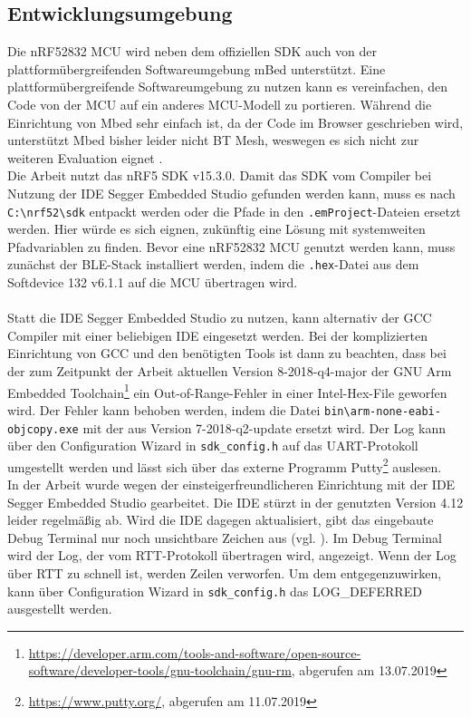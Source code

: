 \subsection{Entwicklungsumgebung}
Die nRF52832 MCU wird neben dem offiziellen SDK auch von der plattformübergreifenden Softwareumgebung mBed unterstützt.
Eine plattformübergreifende Softwareumgebung zu nutzen kann es vereinfachen, den Code von der MCU auf ein anderes MCU-Modell zu portieren.
Während die Einrichtung von Mbed sehr einfach ist, da der Code im Browser geschrieben wird, unterstützt Mbed bisher leider nicht BT Mesh, weswegen es sich nicht zur weiteren Evaluation eignet \cite{site_mbedMesh}.\\
Die Arbeit nutzt das nRF5 SDK v15.3.0.
Damit das SDK vom Compiler bei Nutzung der IDE Segger Embedded Studio gefunden werden kann, muss es nach \texttt{C:\textbackslash{}nrf52\textbackslash{}sdk} entpackt werden oder die Pfade in den \texttt{.emProject}-Dateien ersetzt werden.
Hier würde es sich eignen, zukünftig eine Lösung mit systemweiten Pfadvariablen zu finden.
Bevor eine nRF52832 MCU genutzt werden kann, muss zunächst der BLE-Stack installiert werden, indem die \texttt{.hex}-Datei aus dem Softdevice 132 v6.1.1 auf die MCU übertragen wird.\\\\
Statt die IDE Segger Embedded Studio zu nutzen, kann alternativ der GCC Compiler mit einer beliebigen IDE eingesetzt werden.
Bei der komplizierten Einrichtung von GCC und den benötigten Tools ist dann zu beachten, dass bei der zum Zeitpunkt der Arbeit aktuellen Version 8-2018-q4-major der GNU Arm Embedded Toolchain\footnote{\url{https://developer.arm.com/tools-and-software/open-source-software/developer-tools/gnu-toolchain/gnu-rm}, abgerufen am 13.07.2019} ein Out-of-Range-Fehler in einer Intel-Hex-File geworfen wird.
Der Fehler kann behoben werden, indem die Datei \texttt{bin\textbackslash{}arm-none-eabi-objcopy.exe} mit der aus Version 7-2018-q2-update ersetzt wird.
Der Log kann über den Configuration Wizard in \texttt{sdk\_config.h} auf das UART-Protokoll umgestellt werden und lässt sich über das externe Programm Putty\footnote{\url{https://www.putty.org/}, abgerufen am 11.07.2019} auslesen.\\
In der Arbeit wurde wegen der einsteigerfreundlicheren Einrichtung mit der IDE Segger Embedded Studio gearbeitet.
Die IDE stürzt in der genutzten Version 4.12 leider regelmäßig ab.
Wird die IDE dagegen aktualisiert, gibt das eingebaute Debug Terminal nur noch unsichtbare Zeichen aus (vgl. \cite{site_sesDebug}).
Im Debug Terminal wird der Log, der vom RTT-Protokoll übertragen wird, angezeigt.
Wenn der Log über RTT zu schnell ist, werden Zeilen verworfen.
Um dem entgegenzuwirken, kann über Configuration Wizard in \texttt{sdk\_config.h} das LOG\_DEFERRED ausgestellt werden.

